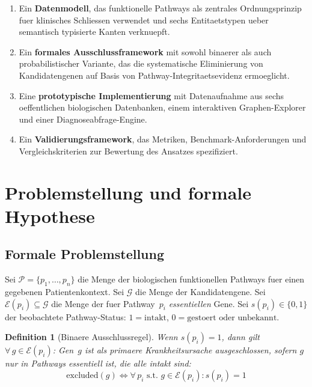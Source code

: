 \documentclass[12pt,a4paper]{article}
\newtheorem{definition}{Definition}
\begin{document}
\begin{enumerate}
    \item Ein \textbf{Datenmodell}, das funktionelle Pathways als zentrales Ordnungsprinzip fuer klinisches Schliessen verwendet und sechs Entitaetstypen ueber semantisch typisierte Kanten verknuepft.
    \item Ein \textbf{formales Ausschlussframework} mit sowohl binaerer als auch probabilistischer Variante, das die systematische Eliminierung von Kandidatengenen auf Basis von Pathway-Integritaetsevidenz ermoeglicht.
    \item Eine \textbf{prototypische Implementierung} mit Datenaufnahme aus sechs oeffentlichen biologischen Datenbanken, einem interaktiven Graphen-Explorer und einer Diagnoseabfrage-Engine.
    \item Ein \textbf{Validierungsframework}, das Metriken, Benchmark-Anforderungen und Vergleichskriterien zur Bewertung des Ansatzes spezifiziert.
\end{enumerate}

\section{Problemstellung und formale Hypothese}
\label{sec:problem}

\subsection{Formale Problemstellung}

Sei $\mathcal{P} = \{p_1, \ldots, p_n\}$ die Menge der biologischen funktionellen Pathways fuer einen gegebenen Patientenkontext. Sei $\mathcal{G}$ die Menge der Kandidatengene. Sei $\mathcal{E}(p_i) \subseteq \mathcal{G}$ die Menge der fuer Pathway~$p_i$ \emph{essentiellen} Gene. Sei $s(p_i) \in \{0, 1\}$ der beobachtete Pathway-Status: $1 = \text{intakt}$, $0 = \text{gestoert oder unbekannt}$.

\begin{definition}[Binaere Ausschlussregel]
\label{def:binary}
Wenn $s(p_i) = 1$, dann gilt $\forall\, g \in \mathcal{E}(p_i)$: Gen~$g$ ist als primaere Krankheitsursache \emph{ausgeschlossen}, sofern $g$ nur in Pathways essentiell ist, die alle intakt sind:
\begin{equation}
    \text{excluded}(g) \iff \forall\, p_i \text{ s.t. } g \in \mathcal{E}(p_i): s(p_i) = 1
\end{equation}
\end{definition}
\end{document}
